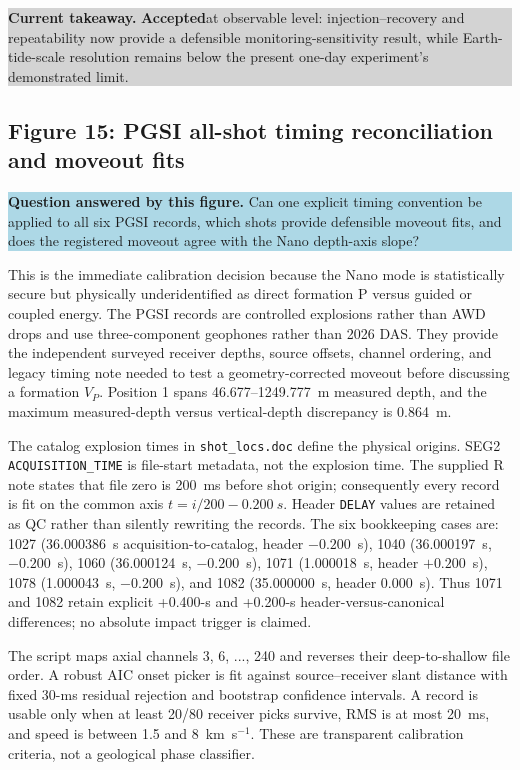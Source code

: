 \documentclass[11pt]{article}
\newcommand{\accepted}{\textcolor{accepted}{\textbf{Accepted}}}
\newcommand{\code}[1]{\texttt{#1}}
\newcommand{\figquestion}[1]{\par\medskip\noindent\colorbox{lightblue}{\parbox{0.95\linewidth}{\textcolor{questionblue}{\textbf{Question answered by this figure.}} #1}}\par\medskip}
\newcommand{\takeaway}[1]{\par\smallskip\noindent\colorbox{lightgray}{\parbox{0.95\linewidth}{\textbf{Current takeaway.} #1}}\par\medskip}
\begin{document}
\takeaway{\accepted at observable level: injection--recovery and repeatability
now provide a defensible monitoring-sensitivity result, while Earth-tide-scale
resolution remains below the present one-day experiment's demonstrated limit.}


\subsection{Figure 15: PGSI all-shot timing reconciliation and moveout fits}
\figquestion{Can one explicit timing convention be applied to all six PGSI
records, which shots provide defensible moveout fits, and does the registered
moveout agree with the Nano depth-axis slope?}

This is the immediate calibration decision because the Nano mode is statistically
secure but physically underidentified as direct formation P versus guided or
coupled energy.  The PGSI records are controlled explosions rather than AWD
drops and use three-component geophones rather than 2026 DAS.  They provide the
independent surveyed receiver depths, source offsets, channel ordering, and
legacy timing note needed to test a geometry-corrected moveout before discussing
a formation $V_P$.  Position 1 spans 46.677--1249.777~m measured depth, and the
maximum measured-depth versus vertical-depth discrepancy is 0.864~m.

The catalog explosion times in \texttt{shot\_locs.doc} define the physical
origins.  SEG2 \code{ACQUISITION\_TIME} is file-start metadata, not the
explosion time.  The supplied R note states that file zero is 200~ms before
shot origin; consequently every record is fit on the common axis
$t=i/200-0.200~s$.  Header \code{DELAY} values are retained as QC rather
than silently rewriting the records.  The six bookkeeping cases are: 1027
(36.000386~s acquisition-to-catalog, header $-0.200$~s), 1040
(36.000197~s, $-0.200$~s), 1060 (36.000124~s, $-0.200$~s), 1071
(1.000018~s, header $+0.200$~s), 1078 (1.000043~s, $-0.200$~s), and 1082
(35.000000~s, header 0.000~s).  Thus 1071 and 1082 retain explicit +0.400-s
and +0.200-s header-versus-canonical differences; no absolute impact trigger
is claimed.

The script  maps axial channels 3, 6,
..., 240 and reverses their deep-to-shallow file order.  A robust AIC onset
picker is fit against source--receiver slant distance with fixed 30-ms residual
rejection and bootstrap confidence intervals.  A record is usable only when
at least 20/80 receiver picks survive, RMS is at most 20~ms, and speed is
between 1.5 and 8~km~s$^{-1}$.  These are transparent calibration criteria,
not a geological phase classifier.
\end{document}
